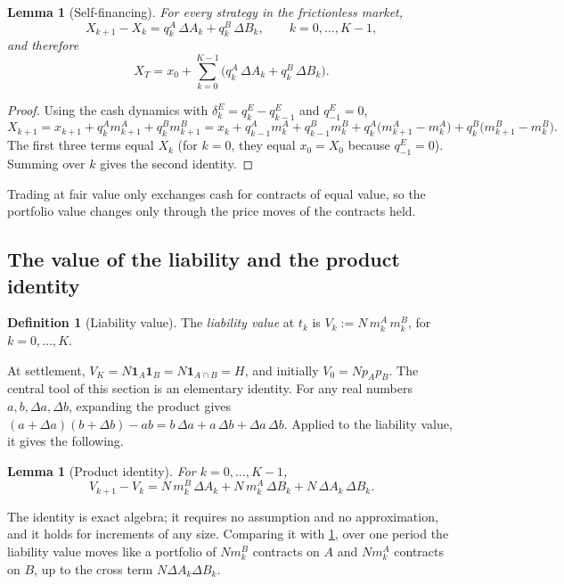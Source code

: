 \documentclass[11pt,a4paper]{article}
\theoremstyle{plain}
\newtheorem{lemma}[theorem]{Lemma}
\theoremstyle{definition}
\newtheorem{definition}[theorem]{Definition}
\theoremstyle{remark}
\newcommand{\1}{\mathbf{1}}
\begin{document}
\begin{lemma}[Self-financing]
\label{lem:selffin}
For every strategy in the frictionless market,
\[
X_{k+1} - X_k = q^A_k\,\Delta A_k + q^B_k\,\Delta B_k,\qquad k=0,\dots,K-1,
\]
and therefore
\[
X_T = x_0 + \sum_{k=0}^{K-1}\bigl(q^A_k\,\Delta A_k + q^B_k\,\Delta B_k\bigr).
\]
\end{lemma}

\begin{proof}
Using the cash dynamics with $\delta^E_k = q^E_k - q^E_{k-1}$ and $q^E_{-1}=0$,
\[
X_{k+1} = x_{k+1} + q^A_k m^A_{k+1} + q^B_k m^B_{k+1} = x_k + q^A_{k-1}m^A_k + q^B_{k-1}m^B_k + q^A_k\bigl(m^A_{k+1}-m^A_k\bigr) + q^B_k\bigl(m^B_{k+1}-m^B_k\bigr).
\]
The first three terms equal $X_k$ (for $k=0$, they equal $x_0 = X_0$ because $q^E_{-1}=0$). Summing over $k$ gives the second identity.
\end{proof}

Trading at fair value only exchanges cash for contracts of equal value, so the portfolio value changes only through the price moves of the contracts held.

\subsection{The value of the liability and the product identity}

\begin{definition}[Liability value]
\label{def:liability-value}
The \emph{liability value} at $t_k$ is $V_k := N\,m^A_k\,m^B_k$, for $k=0,\dots,K$.
\end{definition}

At settlement, $V_K = N\1_A\1_B = N\1_{A\cap B} = H$, and initially $V_0 = Np_Ap_B$. The central tool of this section is an elementary identity. For any real numbers $a,b,\Delta a,\Delta b$, expanding the product gives $(a+\Delta a)(b+\Delta b) - ab = b\,\Delta a + a\,\Delta b + \Delta a\,\Delta b$. Applied to the liability value, it gives the following.

\begin{lemma}[Product identity]
\label{lem:product}
For $k=0,\dots,K-1$,
\begin{equation}
\label{eq:product}
V_{k+1}-V_k = N\,m^B_k\,\Delta A_k + N\,m^A_k\,\Delta B_k + N\,\Delta A_k\,\Delta B_k.
\end{equation}
\end{lemma}

The identity is exact algebra; it requires no assumption and no approximation, and it holds for increments of any size. Comparing it with \cref{lem:selffin}, over one period the liability value moves like a portfolio of $Nm^B_k$ contracts on $A$ and $Nm^A_k$ contracts on $B$, up to the cross term $N\Delta A_k\Delta B_k$.
\end{document}
